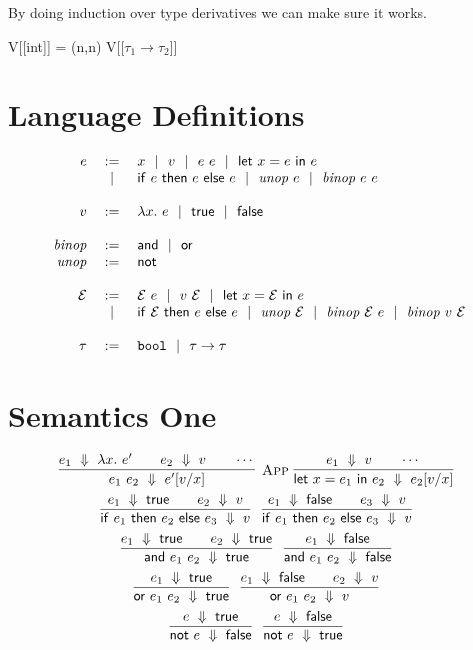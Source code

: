 \documentclass[10pt]{article}
\begin{document}
   \vskip 0.2in
 By doing induction over type derivatives we can make sure it works.
 
 \vskip 0.2in
 
 V[[int]] = {(n,n)}
 \vskip 0.1in
 V[[$\tau_1 \rightarrow \tau_2$]] 
  
  
  
  
  
  
  
  
  
  \newpage
\section{Language Definitions}

\[
  \begin{array}{rcl}
  e  &:=& x \alt v \alt e~e \alt \letdefe{x}{e}{e}\\
     &\alt& \ife{e}{e}{e} \alt \unope{e} \alt \binope{e}{e}\\
  \\ %
  v  &:=& \lamdefe{x}{e} \alt \truev \alt \falsev\\
  \\
  \binopdef &:=& \andop \alt \orop\\
  \unopdef  &:=& \notop \\
  \\
  \Ctxt &:=& \Ctxt~e \alt v~\Ctxt \alt \letdefe{x}{\Ctxt}{e}\\
  &\alt& \ife{\Ctxt}{e}{e} \alt \unope{\Ctxt} \alt \binope{\Ctxt}{e} \alt \binope{v}{\Ctxt}\\
  \\
  \tau  &:=& \boolt \alt \funct{\tau}{\tau}\\
  \end{array}
\]

\section{Semantics One}

\begin{gather*}
\infr[App]
  {\dstep{e_1}{\lamdefe{x}{e'}} \iand \dstep{e_2}{v} \iand \cdots}
  {\dstep{e_1~e_2}{\subst{x}{v}{e'}}}
~
\infr
  {\dstep{e_1}{v} \iand \cdots}
  {\dstep{\letdefe{x}{e_1}{e_2}}{\subst{x}{v}{e_2}}}
\\
\infr
  {\dstep{e_1}{\truev} \iand \dstep{e_2}{v}}
  {\dstep{\ife{e_1}{e_2}{e_3}}{v}}
~
\infr
  {\dstep{e_1}{\falsev} \iand \dstep{e_3}{v}}
  {\dstep{\ife{e_1}{e_2}{e_3}}{v}}
\\
\infr
  {\dstep{e_1}{\truev} \iand \dstep{e_2}{\truev}}
  {\dstep{\ande{e_1}{e_2}}{\truev}}
~
\infr
  {\dstep{e_1}{\falsev}}
  {\dstep{\ande{e_1}{e_2}}{\falsev}}
\\
\infr
  {\dstep{e_1}{\truev}}
  {\dstep{\ore{e_1}{e_2}}{\truev}}
~
\infr
  {\dstep{e_1}{\falsev} \iand \dstep{e_2}{v}}
  {\dstep{\ore{e_1}{e_2}}{v}}
\\
\infr
  {\dstep{e}{\truev}}
  {\dstep{\note{e}}{\falsev}}
~
\infr
  {\dstep{e}{\falsev}}     
  {\dstep{\note{e}}{\truev}}
\end{gather*}
\end{document}
